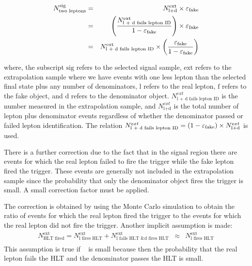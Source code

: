 \documentclass{cmspaper}
\begin{document}
\begin{eqnarray}
  N^{\textrm{sig}}_{\textrm{two leptons}} & = & N^{\textrm{ext}}_{\textrm{l+d}} \times \varepsilon_{\mathrm{fake}} \nonumber \\
  & = &  \left(\frac{N^{\textrm{ext}}_{\textrm{l + d fails lepton ID}}}{1-\varepsilon_{\mathrm{fake}}}\right) \times \varepsilon_{\mathrm{fake}}  \nonumber \\
  & = &  N^{\textrm{ext}}_{\textrm{l + d fails lepton ID}} \times \left(\frac{\varepsilon_{\mathrm{fake}}}{1-\varepsilon_{\mathrm{fake}}}\right)   \nonumber \\
\end{eqnarray}

where, the subscript $\textrm{sig}$ refers to the selected signal sample, $\textrm{ext}$ refers to the extrapolation sample where we have events with one less lepton than the selected final state plus any number of denominators, $\textrm{l}$ refers to the real lepton, $\textrm{f}$ refers to the fake object, and $\textrm{d}$ refers to the denominator object. $N^{ext}_{\textrm{l + d fails lepton ID}}$ is the number measured in the extrapolation sample, and $N^{ext}_{\textrm{l+d}}$ is the total number of lepton plus denominator events regardless of whether the denominator passed or failed lepton identification. The relation $N^{ext}_{\textrm{l + d fails lepton ID}} = (1-\varepsilon_{\mathrm{fake}}) \times N^{ext}_{\textrm{l+d}}$ is used.

There is a further correction due to the fact that in the signal region there are events for which the real lepton failed to fire the trigger while the fake lepton fired the trigger. These events are generally not included in the extrapolation sample since the probability that only the denominator object fires the trigger is small. A small correction factor must be applied.

The correction is obtained by using the Monte Carlo simulation to obtain the ratio of events for which the real lepton fired the trigger to the events for which the real lepton did not fire the trigger. 
Another implicit assumption is made:
\begin{eqnarray}
N^{\textrm{ext}}_{\textrm{HLT fired}} = N^{\textrm{ext}}_{\textrm{l fires HLT}} + N^{\textrm{ext}}_{\textrm{l fails HLT \& d fires HLT}} & \approx & N^{\textrm{ext}}_{\textrm{l fires HLT}} \nonumber \\
\end{eqnarray}
This assumption is true if \epsilonFake~ is small because then the probability that the real lepton fails the HLT and the denominator passes the HLT is small.
\end{document}

